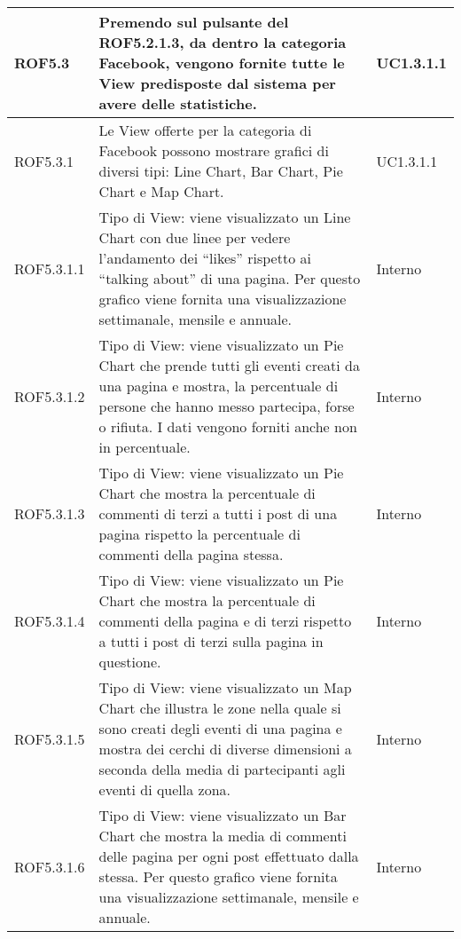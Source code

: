 \begin{center}
\begin{longtable}{| p{2.5cm} | p{8cm} | p{2cm} |}

		ROF5.3  & Premendo sul pulsante del ROF5.2.1.3, da dentro la categoria Facebook, vengono fornite tutte le View predisposte dal sistema per avere delle statistiche. & UC1.3.1.1 \\
		\hline
		ROF5.3.1  & Le View offerte per la categoria di Facebook possono mostrare grafici di diversi tipi: Line Chart, Bar Chart, Pie Chart e Map Chart. &  UC1.3.1.1  \\
		\hline
		ROF5.3.1.1  & Tipo di View: viene visualizzato un Line Chart con due linee per vedere l'andamento dei ``likes'' rispetto ai ``talking about'' di una pagina. Per questo grafico viene fornita una visualizzazione settimanale, mensile e annuale.  & Interno \\
		\hline
		ROF5.3.1.2  &  Tipo di View: viene visualizzato un Pie Chart che prende tutti gli eventi creati da una pagina e mostra, la percentuale di persone che hanno messo partecipa, forse o rifiuta. I dati vengono forniti anche non in percentuale. & Interno \\
		\hline
		ROF5.3.1.3  &  Tipo di View: viene visualizzato un Pie Chart che mostra la percentuale di commenti di terzi a tutti i post di una pagina rispetto la percentuale di commenti della pagina stessa. & Interno \\
		\hline
		ROF5.3.1.4  &  Tipo di View: viene visualizzato un Pie Chart che mostra la percentuale di commenti della pagina e di terzi rispetto a tutti i post di terzi sulla pagina in questione. & Interno \\
		\hline
		ROF5.3.1.5  &  Tipo di View: viene visualizzato un Map Chart che illustra le zone nella quale si sono creati degli eventi di una pagina e mostra dei cerchi di diverse dimensioni a seconda della media di partecipanti agli eventi di quella zona. & Interno \\
		\hline
		ROF5.3.1.6  &  Tipo di View: viene visualizzato un Bar Chart che mostra la media di commenti delle pagina per ogni post effettuato dalla stessa. Per questo grafico viene fornita una visualizzazione settimanale, mensile e annuale. & Interno \\
		\hline



\end{longtable}
\end{center}

